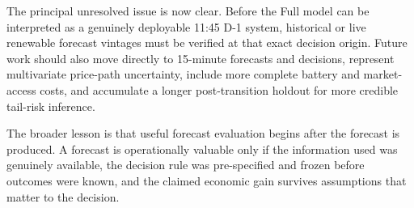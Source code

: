 The principal unresolved issue is now clear. Before the Full model can be interpreted as a genuinely deployable 11:45 D-1 system, historical or live renewable forecast vintages must be verified at that exact decision origin. Future work should also move directly to 15-minute forecasts and decisions, represent multivariate price-path uncertainty, include more complete battery and market-access costs, and accumulate a longer post-transition holdout for more credible tail-risk inference.

The broader lesson is that useful forecast evaluation begins after the forecast is produced. A forecast is operationally valuable only if the information used was genuinely available, the decision rule was pre-specified and frozen before outcomes were known, and the claimed economic gain survives assumptions that matter to the decision.
